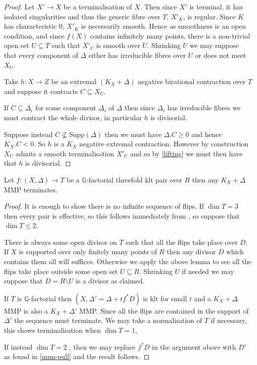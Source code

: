 \documentclass[a4paper,12pt]{amsart}
\begin{document}
	\begin{proof}
		
		Let $X' \to X$ be a terminalisation of $X$. Then since $X'$ is terminal, it has isolated singularities and thus the generic fibre over $T$, $X'_{K}$, is regular. Since $K$ has characteristic $0$, $X'_{K}$ is necessarily smooth. Hence as smoothness is an open condition, and since $f(X)$ contains infinitely many points, there is a non-trivial open set $U \subseteq T$ such that $X'_{U}$ is smooth over $U$. Shrinking $U$ we may suppose that every component of $\Delta$ either has irreducible fibres over $U$ or does not meet $X_{U}$. 
		
		Take $h:X \to Z$ be an extremal $(K_{X}+\Delta)$ negative birational contraction over $T$ and suppose it contracts $C \subseteq X_{U}$. 
		
		If $C \subseteq \Delta_{i}$ for some component $\Delta_{i}$ of $\Delta$ then since $\Delta_{i}$ has irreducible fibres we must contract the whole divisor, in particular $h$ is divisorial.
		
		Suppose instead $C \nsubseteq \text{Supp}(\Delta)$ then we must have $\Delta.C \geq 0$ and hence $K_{X}.C < 0$. So $h$ is a $K_{X}$ negative extremal contraction. However by construction $X_{U}$ admits a smooth terminalisation $X'_{U}$ and so by \autoref{lifting} we must then have that $h$ is divisorial.
	\end{proof}
	
	\begin{corollary}\label{termination}
		Let $f:(X,\Delta) \to T$ be a $\mathbb{Q}$-factorial threefold klt pair over $R$ then any $K_{X}+\Delta$ MMP terminates.
	\end{corollary}
	
	\begin{proof}
		
		It is enough to show there is no infinite sequence of flips. If $\dim T=3$ then every pair is effective, so this follows immediately from \cite[Theorem F]{bhatt2020globally+}, so suppose that $\dim T \leq 2$.
		
		There is always some open divisor on $T$ such that all the flips take place over $D$. If $X$ is supported over only finitely many points of $R$ then any divisor $D$ which contains them all will suffices. Otherwise we apply the above lemma to see all the flips take place outside some open set $U \subseteq R$. Shrinking $U$ if needed we may suppose that $D=R \setminus U$ is a divisor as claimed.

		If $T$ is $\mathbb{Q}$-factorial then $(X,\Delta'=\Delta+tf^{*}D)$ is klt for small $t$ and a $K_{X}+\Delta$ MMP is also a $K_{X}+\Delta'$ MMP. Since all the flips are contained in the support of $\Delta'$ the sequence must terminate. We may take a normalisation of $T$ if necessary, this shows terminalisation when $\dim T=1$,
		
		If instead $\dim T =2$ , then we may replace $f^{*}D$ in the argument above with $D'$ as found in \autoref{num-pull} and the result follows.
		
	\end{proof}
	
\end{document}
